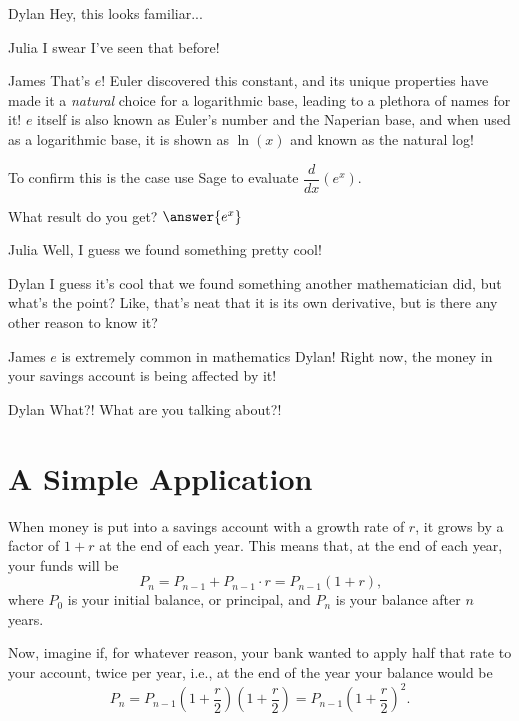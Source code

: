 \documentclass{ximera}
\begin{document}
\begin{question}
\begin{dialogue}
\item[Dylan] Hey, this looks familiar...
\item[Julia] I swear I've seen that before!
\item[James] That's $e$! Euler discovered this constant, and its unique properties have made it a \textit{natural} choice for a logarithmic base, leading to a plethora of names for it! $e$ itself is also known as Euler's number and the Naperian base, and when used as a logarithmic base, it is shown as $\ln \left(x\right)$ and known as the natural log!
\end{dialogue}

To confirm this is the case use Sage to evaluate $\dfrac{d}{dx}(e^x)$.

\begin{onlineOnly}
\begin{sageCell}

\end{sageCell}
\end{onlineOnly}

What result do you get?
$\answer{e^x}$
\end{question}

\begin{dialogue}
\item[Julia] Well, I guess we found something pretty cool!
\item[Dylan] I guess it's cool that we found something another mathematician did, but what's the point? Like, that's neat that it is its own derivative, but is there any other reason to know it?
\item[James] $e$ is extremely common in mathematics Dylan! Right now, the money in your savings account is being affected by it!
\item[Dylan] What?! What are you talking about?!
\end{dialogue}

\section{A Simple Application}
When money is put into a savings account with a growth rate of $r$, it grows by a factor of $1 + r$ at the end of each year. This means that, at the end of each year, your funds will be $$P_n = P_{n-1}+P_{n-1} \cdot r= P_{n-1}(1+r)\text{,}$$ where $P_{0}$ is your initial balance, or principal, and $P_{n}$ is your balance after $n$ years.

Now, imagine if, for whatever reason, your bank wanted to apply half that rate to your account, twice per year, i.e., at the end of the year your balance would be $$P_n = P_{n-1}\left(1+\dfrac{r}{2}\right)\left(1+\dfrac{r}{2}\right) = P_{n-1}\left(1+\dfrac{r}{2}\right)^2\text{.}$$
\end{document}

